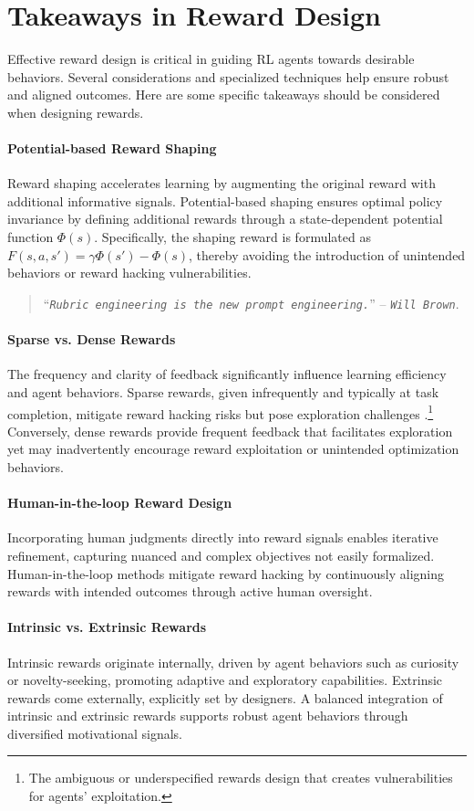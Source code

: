 \newpage
\section{Takeaways in Reward Design} \label{app:reward_hacking}

Effective reward design is critical in guiding RL agents towards desirable behaviors. Several considerations and specialized techniques help ensure robust and aligned outcomes. Here are some specific takeaways should be considered when designing rewards.

\paragraph{Potential-based Reward Shaping}
Reward shaping accelerates learning by augmenting the original reward with additional informative signals. Potential-based shaping ensures optimal policy invariance by defining additional rewards through a state-dependent potential function $\Phi(s)$. Specifically, the shaping reward is formulated as $F(s, a, s') = \gamma \Phi(s') - \Phi(s)$, thereby avoiding the introduction of unintended behaviors or reward hacking vulnerabilities.
\begin{quote}
\scriptsize
	\enquote{\texttt{\textit{Rubric engineering is the new prompt engineering.}}} \hfill -- \texttt{\textit{Will Brown}}.
\end{quote}

\paragraph{Sparse vs. Dense Rewards}
The frequency and clarity of feedback significantly influence learning efficiency and agent behaviors. Sparse rewards, given infrequently and typically at task completion, mitigate reward hacking risks but pose exploration challenges \cite{weng2024rewardhack}.\footnote{The ambiguous or underspecified rewards design that creates vulnerabilities for agents' exploitation.} Conversely, dense rewards provide frequent feedback that facilitates exploration yet may inadvertently encourage reward exploitation or unintended optimization behaviors.

\paragraph{Human-in-the-loop Reward Design}
Incorporating human judgments directly into reward signals enables iterative refinement, capturing nuanced and complex objectives not easily formalized. Human-in-the-loop methods mitigate reward hacking by continuously aligning rewards with intended outcomes through active human oversight.

\paragraph{Intrinsic vs. Extrinsic Rewards}
Intrinsic rewards originate internally, driven by agent behaviors such as curiosity or novelty-seeking, promoting adaptive and exploratory capabilities. Extrinsic rewards come externally, explicitly set by designers. A balanced integration of intrinsic and extrinsic rewards supports robust agent behaviors through diversified motivational signals.
